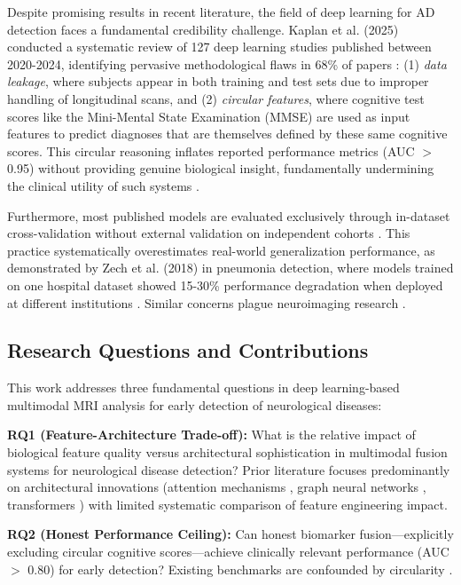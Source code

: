 \documentclass[conference]{IEEEtran}
\begin{document}
Despite promising results in recent literature, the field of deep learning for AD detection faces a fundamental credibility challenge. Kaplan et al. (2025) conducted a systematic review of 127 deep learning studies published between 2020-2024, identifying pervasive methodological flaws in 68\% of papers \cite{Kaplan2025}: (1) \textit{data leakage}, where subjects appear in both training and test sets due to improper handling of longitudinal scans, and (2) \textit{circular features}, where cognitive test scores like the Mini-Mental State Examination (MMSE) are used as input features to predict diagnoses that are themselves defined by these same cognitive scores. This circular reasoning inflates reported performance metrics (AUC $>$ 0.95) without providing genuine biological insight, fundamentally undermining the clinical utility of such systems \cite{Roberts2021}.

Furthermore, most published models are evaluated exclusively through in-dataset cross-validation without external validation on independent cohorts \cite{Park2020}. This practice systematically overestimates real-world generalization performance, as demonstrated by Zech et al. (2018) in pneumonia detection, where models trained on one hospital dataset showed 15-30\% performance degradation when deployed at different institutions \cite{Zech2018}. Similar concerns plague neuroimaging research \cite{Wen2020}.

\subsection{Research Questions and Contributions}

This work addresses three fundamental questions in deep learning-based multimodal MRI analysis for early detection of neurological diseases:

\textbf{RQ1 (Feature-Architecture Trade-off):} What is the relative impact of biological feature quality versus architectural sophistication in multimodal fusion systems for neurological disease detection? Prior literature focuses predominantly on architectural innovations (attention mechanisms \cite{Vaswani2017}, graph neural networks \cite{Ktena2017}, transformers \cite{Dosovitskiy2021}) with limited systematic comparison of feature engineering impact.

\textbf{RQ2 (Honest Performance Ceiling):} Can honest biomarker fusion—explicitly excluding circular cognitive scores—achieve clinically relevant performance (AUC $>$ 0.80) for early detection? Existing benchmarks are confounded by circularity \cite{Wen2020}.
\end{document}

